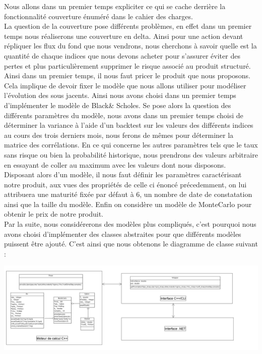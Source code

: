 \documentclass[french,12pt,a4paper]{article}
\begin{document}
Nous allons dans un premier temps expliciter ce qui se cache derrière la fonctionnalité couverture énuméré dans le cahier des charges.\\
La question de la couverture pose différents problèmes, en effet dans un premier temps nous réaliserons une couverture en delta. Ainsi pour une action devant répliquer les flux du fond que nous vendrons, nous cherchons à savoir quelle est la quantité de chaque indices que nous devons acheter pour s'assurer éviter des pertes et plus particulièrement supprimer le risque associé au produit structuré.\\
Ainsi dans un premier temps, il nous faut pricer le produit que nous proposons. Cela implique  de devoir fixer le modèle que nous allons utiliser pour modéliser l'évolution des sous jacents. Ainsi nous avons choisi dans un premier temps d'implémenter le modèle de Black& Scholes. Se pose alors la question des différents paramètres du modèle, nous avons dans un premier temps choisi de déterminer la variance à l'aide d'un backtest sur les valeurs des différents indices au cours des trois derniers mois, nous ferons de mêmes pour déterminer la matrice des corrélations. En ce qui concerne les autres paramètres tels que le taux sans risque ou bien la probabilité historique, nous prendrons des valeurs arbitraire en essayant de coller au maximum avec les valeurs dont nous disposons.\\
Disposant alors d'un modèle, il nous faut définir les paramètres caractérisant notre produit, aux vues des propriétés de celle ci énoncé précedemment, on lui attribuera une maturité fixée par défaut à 6, un nombre de date de constatation ainsi que la taille du modèle.
Enfin on considère un modèle de MonteCarlo pour obtenir le prix de notre produit.\\
Par la suite, nous considérerons des modèles plus compliqués, c'est pourquoi nous avons choisi d'implémenter des classes abstraites pour que différents modèles puissent être ajouté.
C'est ainsi que nous obtenons le diagramme de classe suivant :\\  

\begin{center}
\includegraphics[scale=0.3]{class_diag.png}
\end{center}
 
\end{document}
